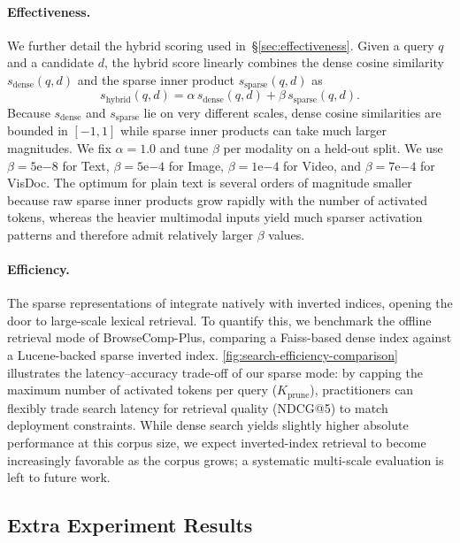 \paragraph{Effectiveness.} We further detail the hybrid scoring used in~\S\ref{sec:effectiveness}. Given a query $q$ and a candidate $d$, the hybrid score linearly combines the dense cosine similarity $s_{\text{dense}}(q,d)$ and the sparse inner product $s_{\text{sparse}}(q,d)$ as
\begin{equation}
s_{\text{hybrid}}(q, d) = \alpha\, s_{\text{dense}}(q, d) + \beta\, s_{\text{sparse}}(q, d).
\end{equation}
Because $s_{\text{dense}}$ and $s_{\text{sparse}}$ lie on very different scales, dense cosine similarities are bounded in $[-1, 1]$ while sparse inner products can take much larger magnitudes. We fix $\alpha = 1.0$ and tune $\beta$ per modality on a held-out split. We use $\beta = 5\mathrm{e}{-8}$ for Text, $\beta = 5\mathrm{e}{-4}$ for Image, $\beta = 1\mathrm{e}{-4}$ for Video, and $\beta = 7\mathrm{e}{-4}$ for VisDoc. The optimum for plain text is several orders of magnitude smaller because raw sparse inner products grow rapidly with the number of activated tokens, whereas the heavier multimodal inputs yield much sparser activation patterns and therefore admit relatively larger $\beta$ values.


\paragraph{Efficiency.}
The sparse representations of \ours integrate natively with inverted indices, opening the door to large-scale lexical retrieval. To quantify this, we benchmark the offline retrieval mode of BrowseComp-Plus, comparing a Faiss-based dense index against a Lucene-backed sparse inverted index.
\autoref{fig:search-efficiency-comparison} illustrates the latency--accuracy trade-off of our sparse mode: by capping the maximum number of activated tokens per query ($K_{\mathrm{prune}}$), practitioners can flexibly trade search latency for retrieval quality (NDCG@5) to match deployment constraints. While dense search yields slightly higher absolute performance at this corpus size, we expect inverted-index retrieval to become increasingly favorable as the corpus grows; a systematic multi-scale evaluation is left to future work. 


\subsection{Extra Experiment Results}

